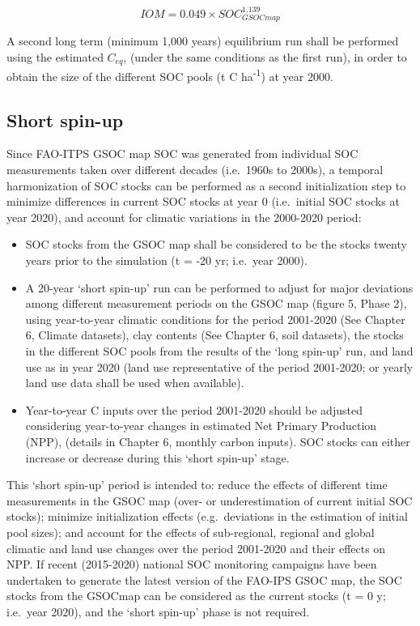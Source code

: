 \documentclass[
  10pt,
  b5paper,
]{book}
\providecommand{\tightlist}{%
  \setlength{\itemsep}{0pt}\setlength{\parskip}{0pt}}
\begin{document}
\begin{equation}
\tag{5.2}
IOM=0.049 \times SOC_{GSOCmap}^{1.139} 
\end{equation}

A second long term (minimum 1,000 years) equilibrium run shall be performed using the estimated \(C_{eq}\), (under the same conditions as the first run), in order to obtain the size of the different SOC pools (t C ha\textsuperscript{-1}) at year 2000.

\hypertarget{short-spin-up}{%
\subsection{Short spin-up}\label{short-spin-up}}

Since FAO-ITPS GSOC map SOC was generated from individual SOC measurements taken over different decades (i.e.~1960s to 2000s), a temporal harmonization of SOC stocks can be performed as a second initialization step to minimize differences in current SOC stocks at year 0 (i.e.~initial SOC stocks at year 2020), and account for climatic variations in the 2000-2020 period:

\begin{itemize}
\tightlist
\item
  SOC stocks from the GSOC map shall be considered to be the stocks twenty years prior to the simulation (t = -20 yr; i.e.~year 2000).
\item
  A 20-year `short spin-up' run can be performed to adjust for major deviations among different measurement periods on the GSOC map (figure 5, Phase 2), using year-to-year climatic conditions for the period 2001-2020 (See Chapter 6, Climate datasets), clay contents (See Chapter 6, soil datasets), the stocks in the different SOC pools from the results of the `long spin-up' run, and land use as in year 2020 (land use representative of the period 2001-2020; or yearly land use data shall be used when available).
\item
  Year-to-year C inputs over the period 2001-2020 should be adjusted considering year-to-year changes in estimated Net Primary Production (NPP), (details in Chapter 6, monthly carbon inputs). SOC stocks can either increase or decrease during this `short spin-up' stage.
\end{itemize}

This `short spin-up' period is intended to: reduce the effects of different time measurements in the GSOC map (over- or underestimation of current initial SOC stocks); minimize initialization effects (e.g.~deviations in the estimation of initial pool sizes); and account for the effects of sub-regional, regional and global climatic and land use changes over the period 2001-2020 and their effects on NPP. If recent (2015-2020) national SOC monitoring campaigns have been undertaken to generate the latest version of the FAO-IPS GSOC map, the SOC stocks from the GSOCmap can be considered as the current stocks (t = 0 y; i.e.~year 2020), and the `short spin-up' phase is not required.
\end{document}

